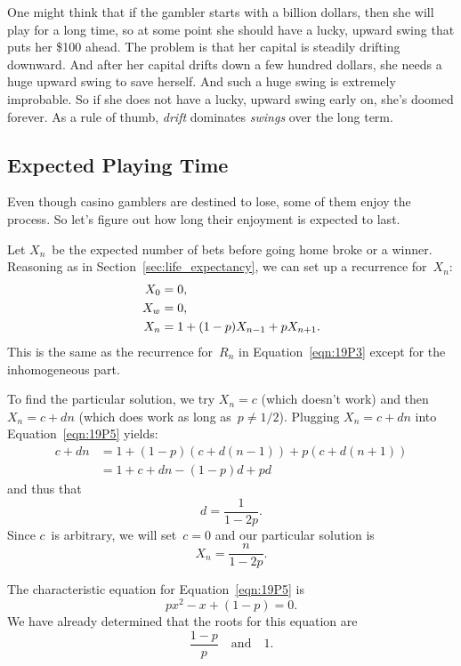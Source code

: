 One might think that if the gambler starts with a billion dollars,
then she will play for a long time, so at some point she should have a
lucky, upward swing that puts her \$100 ahead.  The problem is that
her capital is steadily drifting downward.  And after her capital
drifts down a few hundred dollars, she needs a huge upward swing to
save herself.  And such a huge swing is extremely improbable.  So if
she does not have a lucky, upward swing early on, she's doomed
forever.  As a rule of thumb, \emph{drift} dominates \emph{swings}
over the long term.

\subsection{Expected Playing Time}

Even though casino gamblers are destined to lose, some of them enjoy
the process.  So let's figure out how long their enjoyment is expected
to last.

Let $X_n$~be the expected number of bets before going home broke or a
winner.  Reasoning as in Section~\ref{sec:life_expectancy}, we can set
up a recurrence for~$X_n$:
\begin{align}
    X_0 &= 0, \notag\\
    X_w &= 0, \notag\\
    X_n &= 1 + (1 - p) X_{n - 1} + p X_{n + 1}. \label{eqn:19P5}
\end{align}
This is the same as the recurrence for~$R_n$ in
Equation~\ref{eqn:19P3} except for the inhomogeneous part.

To find the particular solution, we try $X_n = c$ (which doesn't work)
and then $X_n = c + d n$ (which does work as long as~$p \ne 1/2$).
Plugging $X_n = c + d n$ into Equation~\ref{eqn:19P5} yields:
\begin{align*}
c + d n
    &= 1 + (1 - p) (c + d (n - 1)) + p (c + d (n + 1)) \\
    &= 1 + c + d n - (1 - p) d + p d
\end{align*}
and thus that
\begin{equation*}
    d = \frac{1}{1 - 2p}.
\end{equation*}
Since $c$~is arbitrary, we will set~$c = 0$ and our particular
solution is
\begin{equation*}
    X_n = \frac{n}{1 - 2p}.
\end{equation*}

The characteristic equation for Equation~\ref{eqn:19P5} is
\begin{equation*}
    p x^2 - x + (1 - p) = 0.
\end{equation*}
We have already determined that the roots for this equation are
\begin{equation*}
    \frac{1 - p}{p} \quad \text{and} \quad 1.
\end{equation*}

